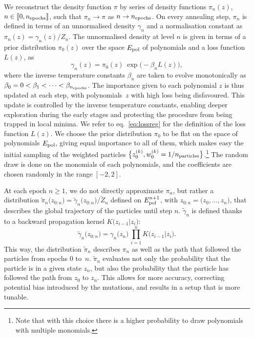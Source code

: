 \documentclass[11pt,a4paper]{article}
\begin{document}
	We reconstruct the density function $\pi$ by series of density functions $\pi_n(z)$, $n\in\llbracket0,n_{\rm epochs}\rrbracket$, such that $\pi_n\to \pi$ as $n\to n_{\rm epochs}$. On every annealing step, $\pi_n$ is defined in terms of an unnormalised density $\gamma_n$ and a normalisation constant as $\pi_n(z) = \gamma_n(z)/Z_n$. The unnormalised density at level $n$ is given in terms of a prior distribution $\pi_0(z)$ over the space $E_{\rm pol}$ of polynomials and a loss function $L(z)$, as
		\begin{equation}\label{eq:gamman}
			\gamma_n(z) = \pi_0(z) \: \exp \Big( -\beta_n L(z)\Big),
		\end{equation}
	where the inverse temperature constants $\beta_n$ are taken to evolve monotonically as $\beta_0 = 0 < \beta_1 <\dots< \beta_{n_{\rm epochs}}$. The importance given to each polynomial $z$ is thus updated at each step, with polynomials~$z$ with high loss being disfavoured. This update is controlled by the inverse temperature constants, enabling deeper exploration during the early stages and protecting the procedure from being trapped in local minima. We refer to eq.~\eqref{eq:lossreg} for the definition of the loss function $L(z)$. We choose the prior distribution $\pi_{0}$ to be flat on the space of polynomials $E_{\rm pol}$, giving equal importance to all of them, which makes easy the initial sampling of the weighted particles $\big\{z^{(k)}_{0},w^{(k)}_{0} = 1/n_{\rm particles}\big\}$.\footnote{Note that with this choice there is a higher probability to draw polynomials with multiple monomials.} The random draw is done on the monomials of each polynomials, and the coefficients are chosen randomly in the range $[-2,2]$.

	At each epoch $n\geq1$, we do not directly approximate $\pi_{n}$, but rather a distribution $\tilde{\pi}_{n}\big(z_{0:n}\big) = \tilde{\gamma}_{n}\big(z_{0:n}\big)/\tilde{Z}_{n}$ defined on $E_{\rm pol}^{n+1}$, with $z_{0:n} = \big(z_{0},\ldots,z_{n}\big)$, that describes the global trajectory of the particles until step $n$. $\tilde{\gamma}_{n}$ is defined thanks to a backward propagation kernel $K\big(z_{i-1}\vert z_{i}\big)$:
	\begin{equation}
		\tilde{\gamma}_{n}\big(z_{0:n}\big) = \gamma_{n}\big(z_{n}\big)\,\prod_{i=1}^{n} K\big(z_{i-1}\vert z_{i}\big).
	\end{equation}
	This way, the distribution $\tilde{\pi}_{n}$ describes $\pi_{n}$ as well as the path that followed the particles from epochs $0$ to~$n$. $\tilde{\pi}_{n}$ evaluates not only the probability that the particle is in a given state $z_{n}$, but also the probability that the particle has followed the path from $z_{0}$ to $z_{n}$. This allows for more accuracy, correcting potential bias introduced by the mutations, and results in a setup that is more tunable.
	
\end{document}
